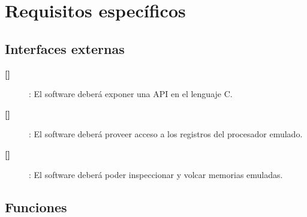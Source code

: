 \documentclass[
  11pt, %
  codirector, %
]{charter}
\makeatletter
\newcommand{\mytwodigits}[1]{\two@digits{#1}}
\newcounter{reqCounter}
\makeatother
\begin{document}
\section{Requisitos específicos}
\label{sec:org40573d1}



\subsection{Interfaces externas}
\label{sec:orgfd5391f}

\begin{description}

\item[\textbf{[\CODrequerimiento\mytwodigits{\value{reqCounter}}]}]: El software deberá exponer una API en el lenguaje C.

\item[\textbf{[\CODrequerimiento\mytwodigits{\value{reqCounter}}]}]: El software deberá proveer acceso a los registros del procesador emulado.

\item[\textbf{[\CODrequerimiento\mytwodigits{\value{reqCounter}}]}]:  El software deberá poder inspeccionar y volcar memorias emuladas.


\end{description}



\subsection{Funciones}
\label{sec:org307bb59}
\end{document}
